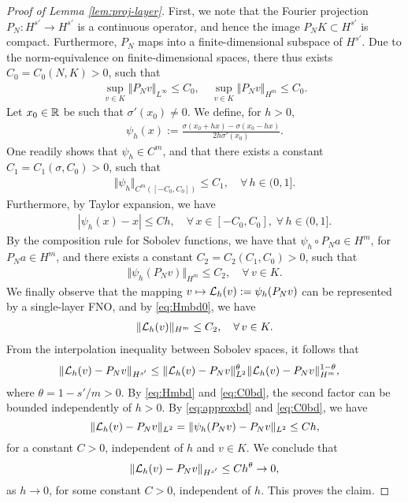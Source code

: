 \documentclass[reqno,a4paper]{amsart}
\begin{document}
\begin{proof}[Proof of Lemma \ref{lem:proj-layer}]
First, we note that the Fourier projection $P_N: H^{s'}\to H^{s'}$ is a continuous operator, and hence the image $P_N K\subset H^{s'}$ is compact. Furthermore, $P_N$ maps into a finite-dimensional subspace of $H^{s'}$. Due to the norm-equivalence on finite-dimensional spaces, there thus exists $C_0 = C_0(N,K) > 0$, such that 
\begin{align} \label{eq:C0bd}
\sup_{v\in K} \Vert P_N v\Vert_{L^\infty} \le C_0, \quad \sup_{v\in K}\Vert P_N v \Vert_{H^m} \le C_0. 
\end{align}
Let $x_0\in \mathbb{R}$ be such that $\sigma'(x_0) \ne 0$. We define, for $h>0$,
\begin{align}
\psi_h(x) := \frac{\sigma(x_0 + hx) - \sigma(x_0-hx)}{2h\sigma'(x_0)}.
\end{align}
One readily shows that $\psi_h \in C^m$, and that there exists a constant $C_1 = C_1(\sigma, C_0)>0$, such that
\begin{align}
\Vert \psi_h \Vert_{C^m([-C_0,C_0])} \le C_1, \quad \forall \, h\in (0,1].
\end{align}
Furthermore, by Taylor expansion, we have 
\begin{align} \label{eq:approxbd}
|\psi_h(x) - x| \le Ch, \quad \forall \, x\in [-C_0,C_0], \; \forall \, h\in (0,1].
\end{align}
By the composition rule for Sobolev functions, we have that $\psi_h\circ P_Na\in H^m$, for $P_Na\in H^m$, and there exists a constant $C_2 = C_2(C_1,C_0)>0$, such that 
\begin{align} \label{eq:Hmbd0}
\Vert \psi_h(P_Nv) \Vert_{H^m} \le C_2, 
\quad
\forall\, v\in K.
\end{align}
We finally observe that the mapping $v\mapsto \mathcal{L}_h(v) := \psi_h(P_Nv)$ can be represented by a single-layer FNO, and by \eqref{eq:Hmbd0}, we have
\begin{align} \label{eq:Hmbd}
\Vert \mathcal{L}_h(v) \Vert_{H^m} \le C_2, 
\quad
\forall\, v\in K.
\end{align}
From the interpolation inequality between Sobolev spaces, it follows that
\begin{align*}
\Vert \mathcal{L}_h(v) - P_Nv \Vert_{H^{s'}}
&\le 
\Vert \mathcal{L}_h(v) - P_Nv \Vert_{L^2}^\theta
\Vert \mathcal{L}_h(v) - P_Nv \Vert_{H^{m}}^{1-\theta},
\end{align*}
where $\theta = 1-s'/m > 0$. By \eqref{eq:Hmbd} and \eqref{eq:C0bd}, the second factor can be bounded independently of $h>0$. By \eqref{eq:approxbd} and \eqref{eq:C0bd}, we have 
\[
\Vert \mathcal{L}_h(v) - P_Nv \Vert_{L^2}
=
\Vert \psi_h(P_Nv) - P_Nv \Vert_{L^2}
\le
Ch,
\]
for a constant $C>0$, independent of $h$ and $v\in K$. We conclude that
\[
\Vert \mathcal{L}_h(v) - P_Nv \Vert_{H^{s'}}
\le C h^\theta \to 0,
\]
as $h\to 0$, for some constant $C>0$, independent of $h$. This proves the claim.
\end{proof}
\end{document}
